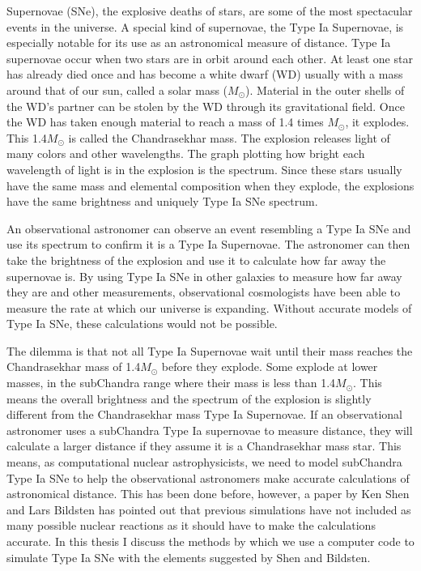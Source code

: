 \documentclass[preprint]{aastex62}
\begin{document}
  Supernovae (SNe), the explosive deaths of stars, are some of the most spectacular events in the universe. A special kind of supernovae, the Type Ia Supernovae, is especially notable for its use as an astronomical measure of distance. Type Ia supernovae occur when two stars are in orbit around each other. At least one star has already died once and has become a white dwarf (WD) usually with a mass around that of our sun, called a solar mass ($M_{\odot}$). Material in the outer shells of the WD's partner can be stolen by the WD through its gravitational field. Once the WD has taken enough material to reach a mass of 1.4 times $M_{\odot}$, it explodes. This 1.4$M_{\odot}$ is called the Chandrasekhar mass. The explosion releases light of many colors and other wavelengths. The graph plotting how bright each wavelength of light is in the explosion is the spectrum. Since these stars usually have the same mass and elemental composition when they explode, the explosions have the same brightness and uniquely Type Ia SNe spectrum. 
  
  An observational astronomer can observe an event resembling a Type Ia SNe and use its spectrum to confirm it is a Type Ia Supernovae. The astronomer can then take the brightness of the explosion and use it to calculate how far away the supernovae is. By using Type Ia SNe in other galaxies to measure how far away they are and other measurements, observational cosmologists have been able to measure the rate at which our universe is expanding. Without accurate models of Type Ia SNe, these calculations would not be possible. 
  
  The dilemma is that not all Type Ia Supernovae wait until their mass reaches  the Chandrasekhar mass of 1.4$M_{\odot}$ before they explode. Some explode at lower masses, in the subChandra range where their mass is less than 1.4$M_{\odot}$. This means the overall brightness and the spectrum of the explosion is slightly different from the Chandrasekhar mass Type Ia Supernovae. If an observational astronomer uses a subChandra Type Ia supernovae to measure distance, they will calculate a larger distance if they assume it is a Chandrasekhar mass star. This means, as computational nuclear astrophysicists, we need to model subChandra Type Ia SNe to help the observational astronomers make accurate calculations of astronomical distance. This has been done before, however, a paper by Ken Shen and Lars Bildsten has pointed out that previous simulations have not included as many possible nuclear reactions as it should have to make the calculations accurate. In this thesis I discuss the methods by which we use a computer code to simulate Type Ia SNe with the elements suggested by Shen and Bildsten. 
\end{document}
